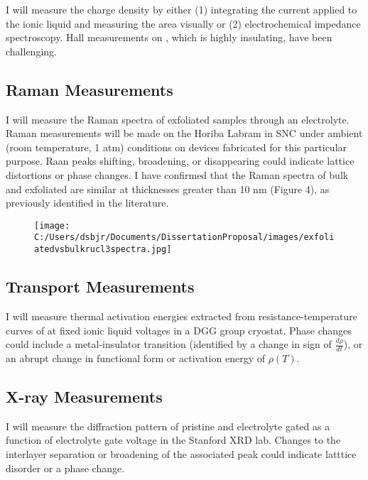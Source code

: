 \documentclass[11pt]{article}
\begin{document}
I will measure the charge density by either (1) integrating the current applied to the ionic liquid and measuring the area visually or (2) electrochemical impedance spectroscopy. Hall measurements on \ruclnospace, which is highly insulating, have been challenging.

\subsection{Raman Measurements}

I will measure the Raman spectra of exfoliated \rucl samples through an electrolyte. Raman measurements will be made on the Horiba Labram in SNC under ambient (room temperature, 1 atm) conditions on devices fabricated for this particular purpose. Raan peaks shifting, broadening, or disappearing could indicate lattice distortions or phase changes. I have confirmed that the Raman spectra of bulk and exfoliated \rucl are similar at thicknesses greater than 10 nm (Figure 4), as previously identified in the literature.

\begin{figure}
\centering
	{\texttt{[image: C:/Users/dsbjr/Documents/DissertationProposal/images/exfoliatedvsbulkrucl3spectra.jpg]}\label{fig:f4}}
  \captionsetup{width=0.5\textwidth}
\end{figure}

\subsection{Transport Measurements}

I will measure thermal activation energies extracted from resistance-temperature curves of \rucl at fixed ionic liquid voltages in a DGG group cryostat. Phase changes could include a metal-insulator transition (identified by a change in sign of $\frac{d\rho}{dt}$), or an abrupt change in functional form or activation energy of $\rho(T)$.

\subsection{X-ray Measurements}

I will measure the diffraction pattern of pristine and electrolyte gated \rucl as a function of electrolyte gate voltage in the Stanford XRD lab. Changes to the interlayer separation or broadening of the associated peak could indicate latttice disorder or a phase change.
\end{document}
